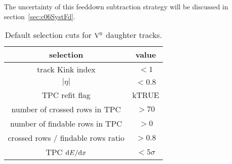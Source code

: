 The uncertainty of this feeddown subtraction strategy will be
discussed in section~\ref{sec:c06SystFd}.


\begin{table}[htdp]
\begin{center}
\begin{tabular}{ c c }
\hline
selection                           & value \\
\hline
track Kink index                    & $<1$ \\
$|\eta|$                            & $<0.8$ \\
TPC refit flag                      & kTRUE \\
number of crossed rows in TPC       & $>70$ \\
number of findable rows in TPC      & $>0$ \\
crossed rows / findable rows ratio  & $>0.8$ \\
TPC ${\rm d}E/{\rm d}x$             & $<5\sigma$ \\
\hline
\end{tabular}
\end{center}
\caption{Default selection cuts for ${\rm V}^{0}$ daughter tracks.}
\label{tab:daughtercuts}
\end{table}

